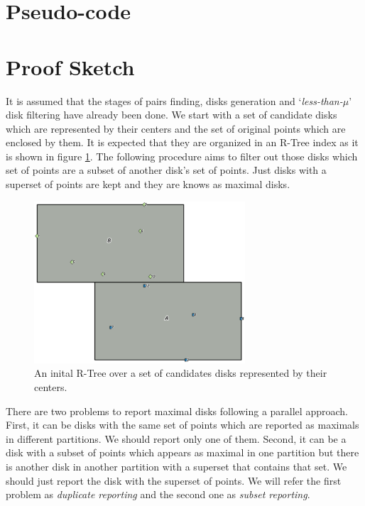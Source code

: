 \documentclass[12pt]{scrartcl}
\begin{document}
 
\section*{Pseudo-code}

\section*{Proof Sketch}
It is assumed that the stages of pairs finding, disks generation and `\textit{less-than-$\mu$}' disk filtering have already been done. We start with a set of candidate disks which are represented by their centers and the set of original points which are enclosed by them.  It is expected that they are organized in an R-Tree index as it is shown in figure \ref{fig:r-tree}.  The following procedure aims to filter out those disks which set of points are a subset of another disk's set of points.  Just disks with a superset of points are kept and they are knows as maximal disks. 

\begin{figure}
	\centering
	\begin{center}
	\includegraphics[width=0.7\textwidth]{./Figures/r-tree}
\end{center}
	\caption{An inital R-Tree over a set of candidates disks represented by their centers.}
	\label{fig:r-tree}
\end{figure}

There are two problems to report maximal disks following a parallel approach. First, it can be disks with the same set of points which are reported as maximals in different partitions.  We should report only one of them.  Second, it can be a disk with a subset of points which appears as maximal in one partition but there is another disk in another partition with a superset that contains that set.   We should just report the disk with the superset of points.  We will refer the first problem as \textit{duplicate reporting} and the second one as \textit{subset reporting}.  
\end{document}

